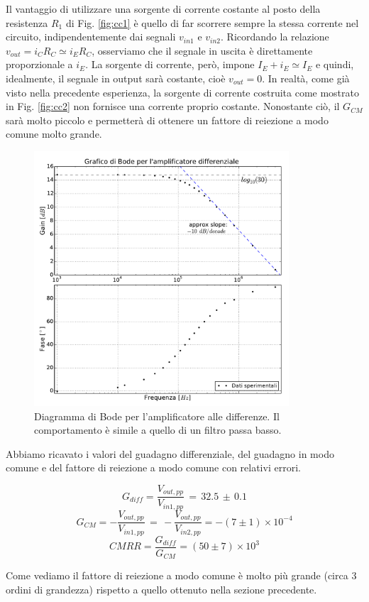 Il vantaggio di utilizzare una sorgente di corrente costante al posto della resistenza $R_1$ di Fig. \ref{fig:cc1} è quello di far scorrere sempre la stessa corrente nel circuito, indipendentemente dai segnali $v_{in1}$ e $v_{in2}$.
Ricordando la relazione $v_{out}=i_C R_C \simeq i_E R_C$, osserviamo che il segnale in uscita è direttamente proporzionale a $i_E$.
La sorgente di corrente, però, impone $I_E + i_E \simeq I_E$ e quindi, idealmente, il segnale in output sarà costante, cioè $v_{out}=0$.
In realtà, come già visto nella precedente esperienza, la sorgente di corrente costruita come mostrato in Fig. \ref{fig:cc2} non fornisce una corrente proprio costante.
Nonostante ciò, il $G_{CM}$ sarà molto piccolo e permetterà di ottenere un fattore di reiezione a modo comune molto grande.

\begin{figure}
	\includegraphics[width=95mm]{g1.pdf}
	\caption{Diagramma di Bode per l'amplificatore alle differenze. Il comportamento è simile a quello di un filtro passa basso.}
	\label{fig:bode}
\end{figure}

Abbiamo ricavato i valori del guadagno differenziale, del guadagno in modo comune e del fattore di reiezione a modo comune con relativi errori.

\noindent
\begin{minipage}{1\linewidth}
\begin{equation}
	G_{diff} = \frac{V_{out,pp}}{V_{in1,pp}} \, = \, 32.5 \,\pm\, 0.1
\end{equation}
\begin{equation}
	G_{CM} = -\frac{V_{out,pp}}{V_{in1,pp}} \, = \, -\frac{V_{out,pp}}{V_{in2,pp}} = -(7 \pm 1) \times 10^{-4}
\end{equation}
\begin{equation}
	CMRR = \frac{G_{diff}}{G_{CM}} = (50 \pm 7) \times 10^3
\end{equation}	
\end{minipage}%

Come vediamo il fattore di reiezione a modo comune è molto più grande (circa 3 ordini di grandezza) rispetto a quello ottenuto nella sezione precedente. 
